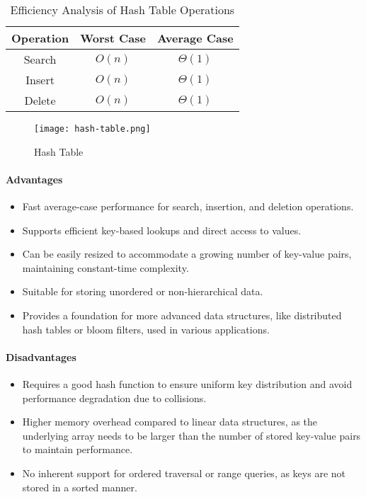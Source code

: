 \begin{table}[h]
    \centering
    \caption{Efficiency Analysis of Hash Table Operations}
    \label{tab:hash-table-efficiency-analysis}
    \begin{tabular}{|c|c|c|}
        \hline
        Operation & Worst Case & Average Case \\ \hline
        Search    & $O(n)$     & $\Theta(1)$  \\ \hline
        Insert    & $O(n)$     & $\Theta(1)$  \\ \hline
        Delete    & $O(n)$     & $\Theta(1)$  \\ \hline
    \end{tabular}
\end{table}
\begin{figure}[!htbp]
    \centering
    \texttt{[image: hash-table.png]}
    \caption{Hash Table \cite{stemmler_2022}}
    \label{fig:hash-table}
\end{figure}
\newpage

\paragraph{Advantages}
\begin{itemize}
    \item Fast average-case performance for search, insertion, and deletion operations.
    \item Supports efficient key-based lookups and direct access to values.
    \item Can be easily resized to accommodate a growing number of key-value pairs, maintaining constant-time complexity.
    \item Suitable for storing unordered or non-hierarchical data.
    \item Provides a foundation for more advanced data structures, like distributed hash tables or bloom filters, used in various applications.
\end{itemize}
\paragraph{Disadvantages}
\begin{itemize}
    \item Requires a good hash function to ensure uniform key distribution and avoid performance degradation due to collisions.
    \item Higher memory overhead compared to linear data structures, as the underlying array needs to be larger than the number of stored key-value pairs to maintain performance.
    \item No inherent support for ordered traversal or range queries, as keys are not stored in a sorted manner.
\end{itemize}

